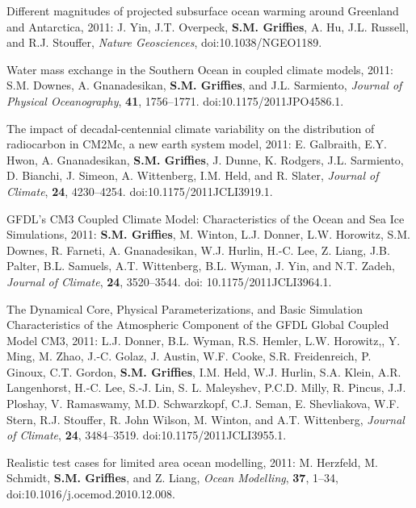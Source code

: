 \begin{etaremune}
\item Different magnitudes of projected subsurface ocean warming
  around Greenland and Antarctica, 2011: J. Yin, J.T. Overpeck, {\bf
    S.M. Griffies}, A. Hu, J.L. Russell, and R.J. Stouffer, {\it
    Nature Geosciences}, doi:10.1038/NGEO1189.

\item Water mass exchange in the Southern Ocean in coupled climate
  models, 2011: S.M. Downes, A. Gnanadesikan, {\bf S.M. Grif\/f\/ies},
  and J.L. Sarmiento, {\it Journal of Physical Oceanography}, {\bf
    41}, 1756--1771.  doi:10.1175/2011JPO4586.1.

\item The impact of decadal-centennial climate variability on the
  distribution of radiocarbon in CM2Mc, a new earth system model,
  2011: E. Galbraith, E.Y. Hwon, A. Gnanadesikan, {\bf
    S.M. Grif\/f\/ies}, J. Dunne, K. Rodgers, J.L. Sarmiento, D.
  Bianchi, J. Simeon, A. Wittenberg, I.M. Held, and R.  Slater, {\it
    Journal of Climate}, {\bf 24}, 4230--4254.
  doi:10.1175/2011JCLI3919.1.

\item GFDL's CM3 Coupled Climate Model: Characteristics of the Ocean
  and Sea Ice Simulations, 2011: {\bf S.M. Grif\/f\/ies}, M. Winton,
  L.J. Donner, L.W. Horowitz, S.M. Downes, R.  Farneti,
  A. Gnanadesikan, W.J. Hurlin, H.-C. Lee, Z. Liang, J.B. Palter,
  B.L. Samuels, A.T. Wittenberg, B.L. Wyman, J.  Yin, and N.T. Zadeh,
  {\it Journal of Climate}, {\bf 24}, 3520--3544.  doi:
  10.1175/2011JCLI3964.1.

\item The Dynamical Core, Physical Parameterizations, and Basic
  Simulation Characteristics of the Atmospheric Component of the GFDL
  Global Coupled Model CM3, 2011: L.J. Donner, B.L. Wyman,
  R.S. Hemler, L.W. Horowitz,, Y. Ming, M. Zhao, J.-C. Golaz,
  J. Austin, W.F. Cooke, S.R. Freidenreich, P. Ginoux, C.T. Gordon,
  {\bf S.M. Grif\/f\/ies}, I.M. Held, W.J. Hurlin, S.A. Klein,
  A.R. Langenhorst, H.-C. Lee, S.-J. Lin, S. L. Maleyshev,
  P.C.D. Milly, R. Pincus, J.J. Ploshay, V. Ramaswamy,
  M.D. Schwarzkopf, C.J. Seman, E. Shevliakova, W.F. Stern,
  R.J. Stouﬀer, R. John Wilson, M.  Winton, and A.T. Wittenberg, {\it
    Journal of Climate}, {\bf 24}, 3484--3519.
  doi:10.1175/2011JCLI3955.1.

\item Realistic test cases for limited area ocean modelling, 2011:
  M. Herzfeld, M. Schmidt, {\bf S.M. Grif\/f\/ies}, and Z. Liang, {\it
    Ocean Modelling}, {\bf 37}, 1--34, doi:10.1016/j.ocemod.2010.12.008.


\end{etaremune}
